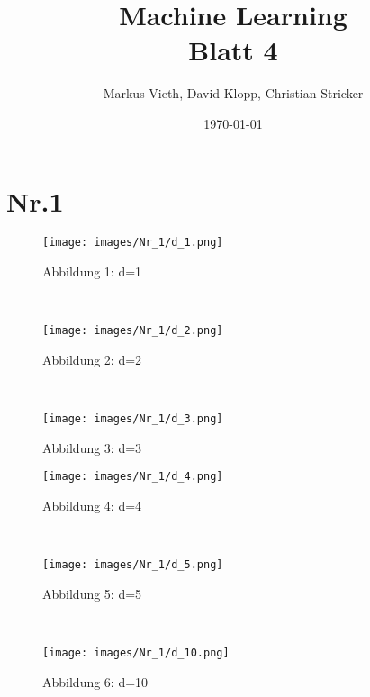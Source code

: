 \documentclass[a4paper,11pt,twoside]{article}
\title{Machine Learning\\ Blatt 4}
\author{Markus Vieth, David Klopp, Christian Stricker}
\date{\today}
\begin{document}
\newcommand{\cor}[1]{\textcolor{red}{\textit{#1}}}
\maketitle
\cleardoublepage
\pagestyle{myheadings}

\newpage

\section*{Nr.1}
\begin{figure*}[h]
	\captionsetup[subfigure]{labelformat=empty}
	\centering
	\begin{subfigure}[t]{0.33\textwidth}
		\texttt{[image: images/Nr\_1/d\_1.png]}
		\caption{Abbildung 1: d=1}
	\end{subfigure}%
	~
	\begin{subfigure}[t]{0.33\textwidth}
		\texttt{[image: images/Nr\_1/d\_2.png]}
		\caption{Abbildung 2: d=2}
	\end{subfigure}%
	~
	\begin{subfigure}[t]{0.33\textwidth}
		\texttt{[image: images/Nr\_1/d\_3.png]}
		\caption{Abbildung 3: d=3}
	\end{subfigure}
\end{figure*}

\begin{figure*}[h]
	\captionsetup[subfigure]{labelformat=empty}
	\centering
	\begin{subfigure}[t]{0.33\textwidth}
		\texttt{[image: images/Nr\_1/d\_4.png]}
		\caption{Abbildung 4: d=4}
	\end{subfigure}%
	~
	\begin{subfigure}[t]{0.33\textwidth}
		\texttt{[image: images/Nr\_1/d\_5.png]}
		\caption{Abbildung 5: d=5}
	\end{subfigure}%
	~
	\begin{subfigure}[t]{0.33\textwidth}
		\texttt{[image: images/Nr\_1/d\_10.png]}
		\caption{Abbildung 6: d=10}
	\end{subfigure}
\end{figure*}
\end{document}
